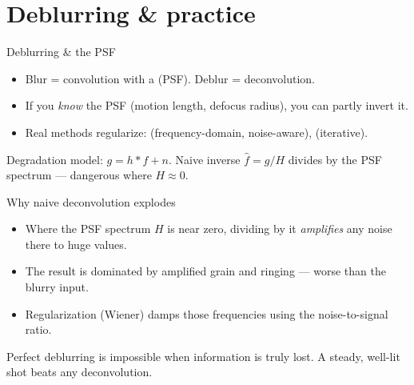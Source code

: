 \documentclass[10pt,aspectratio=169]{beamer}
\begin{document}
\section{Deblurring \& practice}

\begin{frame}{Deblurring \& the PSF}
  \begin{itemize}
    \item Blur = convolution with a  (PSF). Deblur = deconvolution.
    \item If you \emph{know} the PSF (motion length, defocus radius), you can partly invert it.
    \item Real methods regularize:  (frequency-domain, noise-aware),  (iterative).
  \end{itemize}
  \begin{mathbox}
    Degradation model: $g = h * f + n$. Naive inverse $\hat f = g / H$ divides by the PSF spectrum — dangerous where $H\!\approx\!0$.
  \end{mathbox}
\end{frame}

\begin{frame}{Why naive deconvolution explodes}
  \begin{itemize}
    \item Where the PSF spectrum $H$ is near zero, dividing by it \emph{amplifies} any noise there to huge values.
    \item The result is dominated by amplified grain and ringing — worse than the blurry input.
    \item Regularization (Wiener) damps those frequencies using the noise-to-signal ratio.
  \end{itemize}
  \begin{badbox}
    Perfect deblurring is impossible when information is truly lost. A steady, well-lit shot beats any deconvolution.
  \end{badbox}
\end{frame}
\end{document}
